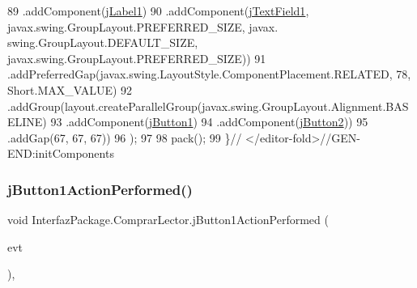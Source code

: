 \begin{DoxyCode}
89                     .addComponent(\mbox{\hyperlink{class_interfaz_package_1_1_comprar_lector_a7e62e32a7c3e71321d44cc91402fa5d2}{jLabel1}})
90                     .addComponent(\mbox{\hyperlink{class_interfaz_package_1_1_comprar_lector_abba4b0576e701088c0c1389d7e28aaa9}{jTextField1}}, javax.swing.GroupLayout.PREFERRED\_SIZE, javax.
      swing.GroupLayout.DEFAULT\_SIZE, javax.swing.GroupLayout.PREFERRED\_SIZE))
91                 .addPreferredGap(javax.swing.LayoutStyle.ComponentPlacement.RELATED, 78, Short.MAX\_VALUE)
92                 .addGroup(layout.createParallelGroup(javax.swing.GroupLayout.Alignment.BASELINE)
93                     .addComponent(\mbox{\hyperlink{class_interfaz_package_1_1_comprar_lector_a13cefaf762557d197990543e13a3bc59}{jButton1}})
94                     .addComponent(\mbox{\hyperlink{class_interfaz_package_1_1_comprar_lector_abb0ea1df40ce44e8356e98fe9824d075}{jButton2}}))
95                 .addGap(67, 67, 67))
96         );
97 
98         pack();
99     \}\textcolor{comment}{// </editor-fold>//GEN-END:initComponents}
\end{DoxyCode}
\mbox{\label{class_interfaz_package_1_1_comprar_lector_a9466015e1f3d9facbd8b16cb18f5d893}} 
\subsubsection{\texorpdfstring{j\+Button1\+Action\+Performed()}{jButton1ActionPerformed()}}
{\footnotesize\ttfamily void Interfaz\+Package.\+Comprar\+Lector.\+j\+Button1\+Action\+Performed (\begin{DoxyParamCaption}\item[{java.\+awt.\+event.\+Action\+Event}]{evt }\end{DoxyParamCaption})\hspace{0.3cm}{\ttfamily [inline]}, {\ttfamily [private]}}


